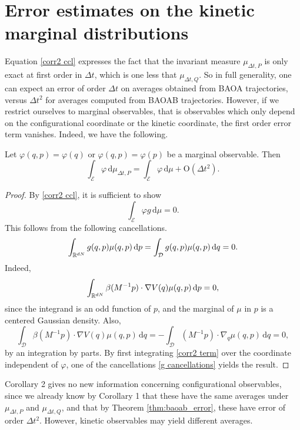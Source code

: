 \section{Error estimates on the kinetic marginal distributions}\label{second order on the marginals}
Equation \eqref{corr2 ccl} expresses the fact that the invariant measure $\mu_{\Delta t,P}$ is only exact at first order in $\Delta t$, which is one less that $\mu_{\Delta t,Q}$.
So in full generality, one can expect an error of order $\Delta t$ on averages obtained from BAOA trajectories, versus $\Delta t^2$ for averages computed from BAOAB trajectories. However, if we restrict ourselves to marginal observables, that is observables which only depend on the configurational coordinate or the kinetic coordinate, the first order error term vanishes.
Indeed, we have the following.
\begin{corollary}\label{corr3 second order marginals}
Let $\varphi(q,p)=\varphi(q)$ or $\varphi(q,p)=\varphi(p)$ be a marginal observable. Then
$$\int_{\mathcal E}\varphi\, \mathrm{d} \mu_{\Delta t,P}=\int_{\mathcal E}\varphi\, \mathrm{d}\mu +\mathrm{O}(\Delta t^2).$$
\end{corollary}
\begin{proof}
  By \eqref{corr2 ccl}, it is sufficient to show
  \begin{equation}\label{corr2 term}\int_{\mathcal E}\varphi g\, \mathrm{d}\mu=0.\end{equation}
  This follows from the following cancellations.
  \begin{equation}
    \label{g cancellations}
      \int_{\mathbb{R}^{dN}}g(q,p)\mu(q,p)\,\mathrm{d}p=\int_{\mathcal D}g(q,p)\mu(q,p)\,\mathrm{d}q=0.
  \end{equation}
  Indeed,
  $$\int_{\mathbb{R}^{dN}}\beta (M^{-1}p)\cdot \nabla V(q)\mu(q,p)\,\mathrm{d}p=0,$$
since the integrand is an odd function of $p$, and the marginal of $\mu$ in $p$ is a centered Gaussian density. Also,
$$\int_{\mathcal D}\beta(M^{-1}p)\cdot \nabla V(q)\mu(q,p)\,\mathrm{d}q=-\int_{\mathcal D}(M^{-1}p)\cdot \nabla_q\mu(q,p)\,\mathrm{d}q=0,$$
by an integration by parts. By first integrating \eqref{corr2 term} over the coordinate independent of $\varphi$, one of the cancellations \eqref{g cancellations} yields the result.
\end{proof}

Corollary 2 gives no new information concerning configurational observables, since we already know by Corollary 1 that these have the same averages under $\mu_{\Delta t,P}$ and $\mu_{\Delta t,Q}$, and that by Theorem \ref{thm:baoab_error}, these have error of order $\Delta t^2$.
However, kinetic observables may yield different averages.


